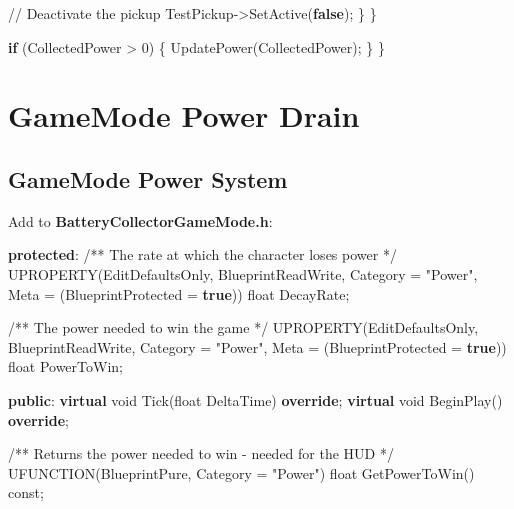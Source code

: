 \documentclass[
  letterpaper,
  DIV=11,
  numbers=noendperiod]{scrartcl}
\newenvironment{Shaded}{\begin{snugshade}}{\end{snugshade}}
\newcommand{\AttributeTok}[1]{\textcolor[rgb]{0.40,0.45,0.13}{#1}}
\newcommand{\CommentTok}[1]{\textcolor[rgb]{0.37,0.37,0.37}{#1}}
\newcommand{\ControlFlowTok}[1]{\textcolor[rgb]{0.00,0.23,0.31}{\textbf{#1}}}
\newcommand{\DataTypeTok}[1]{\textcolor[rgb]{0.68,0.00,0.00}{#1}}
\newcommand{\DecValTok}[1]{\textcolor[rgb]{0.68,0.00,0.00}{#1}}
\newcommand{\KeywordTok}[1]{\textcolor[rgb]{0.00,0.23,0.31}{\textbf{#1}}}
\newcommand{\NormalTok}[1]{\textcolor[rgb]{0.00,0.23,0.31}{#1}}
\newcommand{\OperatorTok}[1]{\textcolor[rgb]{0.37,0.37,0.37}{#1}}
\newcommand{\StringTok}[1]{\textcolor[rgb]{0.13,0.47,0.30}{#1}}
\begin{document}
\begin{Shaded}
\begin{Highlighting}[]
            \CommentTok{// Deactivate the pickup}
\NormalTok{            TestPickup}\OperatorTok{{-}\textgreater{}}\NormalTok{SetActive}\OperatorTok{(}\KeywordTok{false}\OperatorTok{);}
        \OperatorTok{\}}
    \OperatorTok{\}}
    
    \ControlFlowTok{if} \OperatorTok{(}\NormalTok{CollectedPower }\OperatorTok{\textgreater{}} \DecValTok{0}\OperatorTok{)}
    \OperatorTok{\{}
\NormalTok{        UpdatePower}\OperatorTok{(}\NormalTok{CollectedPower}\OperatorTok{);}
    \OperatorTok{\}}
\OperatorTok{\}}
\end{Highlighting}
\end{Shaded}

\section{GameMode Power Drain}\label{gamemode-power-drain}

\subsection{GameMode Power System}\label{gamemode-power-system}

Add to \textbf{BatteryCollectorGameMode.h}:

\begin{Shaded}
\begin{Highlighting}[]
\KeywordTok{protected}\OperatorTok{:}
    \CommentTok{/** The rate at which the character loses power */}
\NormalTok{    UPROPERTY}\OperatorTok{(}\NormalTok{EditDefaultsOnly}\OperatorTok{,}\NormalTok{ BlueprintReadWrite}\OperatorTok{,}\NormalTok{ Category }\OperatorTok{=} \StringTok{"Power"}\OperatorTok{,}\NormalTok{ Meta }\OperatorTok{=} \OperatorTok{(}\NormalTok{BlueprintProtected }\OperatorTok{=} \KeywordTok{true}\OperatorTok{))}
    \DataTypeTok{float}\NormalTok{ DecayRate}\OperatorTok{;}
    
    \CommentTok{/** The power needed to win the game */}
\NormalTok{    UPROPERTY}\OperatorTok{(}\NormalTok{EditDefaultsOnly}\OperatorTok{,}\NormalTok{ BlueprintReadWrite}\OperatorTok{,}\NormalTok{ Category }\OperatorTok{=} \StringTok{"Power"}\OperatorTok{,}\NormalTok{ Meta }\OperatorTok{=} \OperatorTok{(}\NormalTok{BlueprintProtected }\OperatorTok{=} \KeywordTok{true}\OperatorTok{))}
    \DataTypeTok{float}\NormalTok{ PowerToWin}\OperatorTok{;}

\KeywordTok{public}\OperatorTok{:}
    \KeywordTok{virtual} \DataTypeTok{void}\NormalTok{ Tick}\OperatorTok{(}\DataTypeTok{float}\NormalTok{ DeltaTime}\OperatorTok{)} \KeywordTok{override}\OperatorTok{;}
    \KeywordTok{virtual} \DataTypeTok{void}\NormalTok{ BeginPlay}\OperatorTok{()} \KeywordTok{override}\OperatorTok{;}
    
    \CommentTok{/** Returns the power needed to win {-} needed for the HUD */}
\NormalTok{    UFUNCTION}\OperatorTok{(}\NormalTok{BlueprintPure}\OperatorTok{,}\NormalTok{ Category }\OperatorTok{=} \StringTok{"Power"}\OperatorTok{)}
    \DataTypeTok{float}\NormalTok{ GetPowerToWin}\OperatorTok{()} \AttributeTok{const}\OperatorTok{;}
\end{Highlighting}
\end{Shaded}
\end{document}
